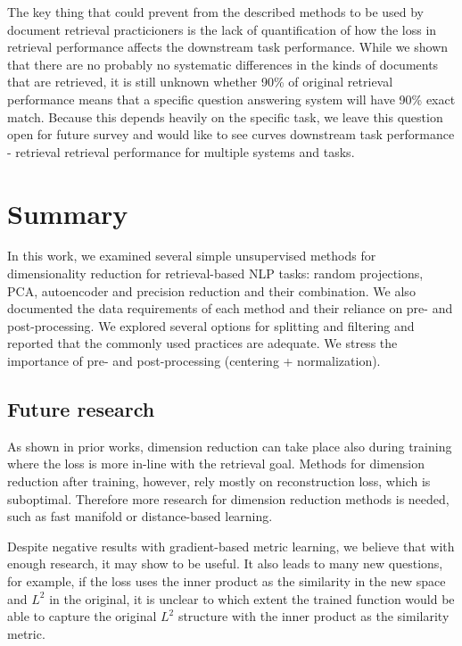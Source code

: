 The key thing that could prevent from the described methods to be used by document retrieval practicioners is the lack of quantification of how the loss in retrieval performance affects the downstream task performance.
While we shown that there are no probably no systematic differences in the kinds of documents that are retrieved, it is still unknown whether 90\% of original retrieval performance means that a specific question answering system will have 90\% exact match.
Because this depends heavily on the specific task, we leave this question open for future survey and would like to see curves downstream task performance - retrieval retrieval performance for multiple systems and tasks.

\section{Summary} \label{sec:conclusion}

In this work, we examined several simple unsupervised methods for dimensionality reduction for retrieval-based NLP tasks: random projections, PCA, autoencoder and precision reduction and their combination.
We also documented the data requirements of each method and their reliance on pre- and post-processing.
We explored several options for splitting and filtering and reported that the commonly used practices are adequate.
We stress the importance of pre- and post-processing (centering + normalization).

\subsection*{Future research}

As shown in prior works, dimension reduction can take place also during training where the loss is more in-line with the retrieval goal.
Methods for dimension reduction after training, however, rely mostly on reconstruction loss, which is suboptimal.
Therefore more research for dimension reduction methods is needed, such as fast manifold or distance-based learning.

Despite negative results with gradient-based metric learning, we believe that with enough research, it may show to be useful.
It also leads to many new questions, for example, if the loss uses the inner product as the similarity in the new space and $L^2$ in the original, it is unclear to which extent the trained function would be able to capture the original $L^2$ structure with the inner product as the similarity metric.